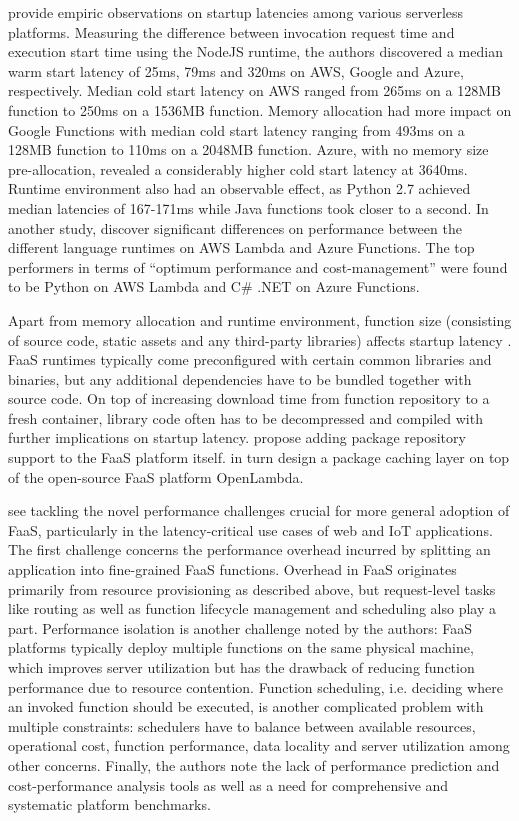 \textcite{wang18peekingbehindcurtains} provide empiric observations on startup latencies among various serverless platforms. Measuring the difference between invocation request time and execution start time using the NodeJS runtime, the authors discovered a median warm start latency of 25ms, 79ms and 320ms on AWS, Google and Azure, respectively. Median cold start latency on AWS ranged from 265ms on a 128MB function to 250ms on a 1536MB function. Memory allocation had more impact on Google Functions with median cold start latency ranging from 493ms on a 128MB function to 110ms on a 2048MB function. Azure, with no memory size pre-allocation, revealed a considerably higher cold start latency at 3640ms. Runtime environment also had an observable effect, as Python 2.7 achieved median latencies of 167-171ms while Java functions took closer to a second. In another study, \textcite{jackson18languageImpact} discover significant differences on performance between the different language runtimes on AWS Lambda and Azure Functions. The top performers in terms of ``optimum performance and cost-management'' were found to be Python on AWS Lambda and C\# .NET on Azure Functions.

Apart from memory allocation and runtime environment, function size (consisting of source code, static assets and any third-party libraries) affects startup latency \parencite{hendrickson16openlambda}. FaaS runtimes typically come preconfigured with certain common libraries and binaries, but any additional dependencies have to be bundled together with source code. On top of increasing download time from function repository to a fresh container, library code often has to be decompressed and compiled with further implications on startup latency. \textcite{hendrickson16openlambda} propose adding package repository support to the FaaS platform itself. \textcite{oakes17pipsqueak} in turn design a package caching layer on top of the open-source FaaS platform OpenLambda.

\textcite{van18perfchallenges} see tackling the novel performance challenges crucial for more general adoption of FaaS, particularly in the latency-critical use cases of web and IoT applications. The first challenge concerns the performance overhead incurred by splitting an application into fine-grained FaaS functions. Overhead in FaaS originates primarily from resource provisioning as described above, but request-level tasks like routing as well as function lifecycle management and scheduling also play a part. Performance isolation is another challenge noted by the authors: FaaS platforms typically deploy multiple functions on the same physical machine, which improves server utilization but has the drawback of reducing function performance due to resource contention. Function scheduling, i.e. deciding where an invoked function should be executed, is another complicated problem with multiple constraints: schedulers have to balance between available resources, operational cost, function performance, data locality and server utilization among other concerns. Finally, the authors note the lack of performance prediction and cost-performance analysis tools as well as a need for comprehensive and systematic platform benchmarks.

